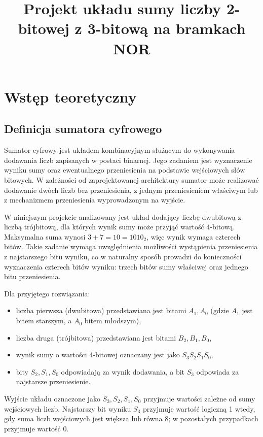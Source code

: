 \documentclass[11pt]{article}
\title{Projekt układu sumy liczby 2-bitowej z 3-bitową na bramkach NOR}
\author{}
\date{}
\begin{document}
\maketitle
\vspace{-4.5cm}
\tableofcontents


\section{Wstęp teoretyczny}

\subsection{Definicja sumatora cyfrowego}

Sumator cyfrowy jest układem kombinacyjnym służącym do wykonywania dodawania liczb zapisanych w postaci binarnej. Jego zadaniem jest wyznaczenie wyniku sumy oraz ewentualnego przeniesienia na podstawie wejściowych słów bitowych. W zależności od zaprojektowanej architektury sumator może realizować dodawanie dwóch liczb bez przeniesienia, z jednym przeniesieniem właściwym lub z mechanizmem przeniesienia wyprowadzonym na wyjście.

W niniejszym projekcie analizowany jest układ dodający liczbę dwubitową z liczbą trójbitową, dla których wynik sumy może przyjąć wartość 4-bitową. Maksymalna suma wynosi \(3 + 7 = 10 = 1010_2\), więc wynik wymaga czterech bitów. Takie zadanie wymaga uwzględnienia możliwości wystąpienia przeniesienia z najstarszego bitu wyniku, co w naturalny sposób prowadzi do konieczności wyznaczenia czterech bitów wyniku: trzech bitów sumy właściwej oraz jednego bitu przeniesienia.

Dla przyjętego rozwiązania:
\begin{itemize}
    \item liczba pierwsza (dwubitowa) przedstawiana jest bitami \(A_1, A_0\) (gdzie \(A_1\) jest bitem starszym, a \(A_0\) bitem młodszym),
    \item liczba druga (trójbitowa) przedstawiana jest bitami \(B_2, B_1, B_0\),
    \item wynik sumy o wartości 4-bitowej oznaczany jest jako \(S_3 S_2 S_1 S_0\),
    \item bity \(S_2, S_1, S_0\) odpowiadają za wynik dodawania, a bit \(S_3\) odpowiada za najstarsze przeniesienie.
\end{itemize}

Wyjście układu oznaczone jako \(S_3, S_2, S_1, S_0\) przyjmuje wartości zależne od sumy wejściowych liczb. Najstarszy bit wyniku \(S_3\) przyjmuje wartość logiczną 1 wtedy, gdy suma liczb wejściowych jest większa lub równa 8; w pozostałych przypadkach przyjmuje wartość 0.
\end{document}
